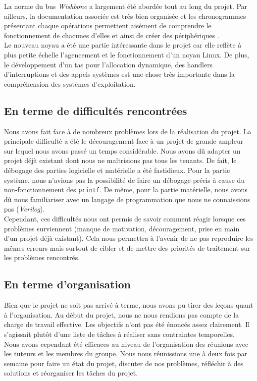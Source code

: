 La norme du bus \textit{Wishbone} a largement été abordée tout au long du projet. Par ailleurs, la documentation associée est très bien organisée et les chronogrammes présentant chaque opérations permettent aisément de comprendre le fonctionnement de chacunes d'elles et ainsi de créer des périphériques .\\

Le nouveau noyau a été une partie intéressante dans le projet car elle reflète à plus petite échelle l'agencement et le fonctionnement d'un noyau Linux. De plus, le développement d'un tas pour l'allocation dynamique, des handlers d'interruptions et des appels systèmes est une chose très importante dans la compréhension des systèmes d'exploitation.

\subsection{En terme de difficultés rencontrées}

Nous avons fait face à de nombreux problèmes lors de la réalisation du projet. La principale difficulté a été le découragement face à un projet de grande ampleur sur lequel nous avons passé un temps considérable. Nous avons dû adapter un projet déjà existant dont nous ne maîtrisions pas tous les tenants. De fait, le débogage des parties logicielle et matérielle a été fastidieux. Pour la partie système, nous n'avions pas la possibilité de faire un débogage précis à cause du non-fonctionnement des \texttt{printf}. De même, pour la partie matérielle, nous avons dû nous familiariser avec un langage de programmation que nous ne connaissions pas (\textit{Verilog}).\\
Cependant, ces difficultés nous ont permis de savoir comment réagir lorsque ces problèmes surviennent (manque de motivation, découragement, prise en main d'un projet déjà existant). Cela nous permettra à l'avenir de ne pas reproduire les mêmes erreurs mais surtout de cibler et de mettre des priorités de traitement sur les problèmes rencontrés.

\subsection{En terme d'organisation}

Bien que le projet ne soit pas arrivé à terme, nous avons pu tirer des leçons quant à l'organisation. Au début du projet, nous ne nous rendions pas compte de la charge de travail effective. Les objectifs n'ont pas été énoncés assez clairement. Il s'agissait plutôt d'une liste de tâches à réaliser sans contraintes temporelles.\\
Nous avons cependant été efficaces au niveau de l'organisation des réunions avec les tuteurs et les membres du groupe. Nous nous réunissions une à deux fois par semaine pour faire un état du projet, discuter de nos problèmes, réfléchir à des solutions et réorganiser les tâches du projet.

